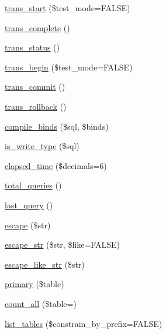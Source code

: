 \begin{DoxyCompactItemize}
\mbox{\hyperlink{class_c_i___d_b__driver_ab082d21c9a77398c6d6705d9e978fb20}{trans\+\_\+start}} (\$test\+\_\+mode=F\+A\+L\+SE)
\item 
\mbox{\hyperlink{class_c_i___d_b__driver_aa0edd209de428801ce5faa1fe740852e}{trans\+\_\+complete}} ()
\item 
\mbox{\hyperlink{class_c_i___d_b__driver_a7ce49452153f13afde8f9c5212028be6}{trans\+\_\+status}} ()
\item 
\mbox{\hyperlink{class_c_i___d_b__driver_a90e153cf190d273336d77cce930587e1}{trans\+\_\+begin}} (\$test\+\_\+mode=F\+A\+L\+SE)
\item 
\mbox{\hyperlink{class_c_i___d_b__driver_af4fbdcdace4aa94a139b64877601fe9b}{trans\+\_\+commit}} ()
\item 
\mbox{\hyperlink{class_c_i___d_b__driver_a53f76d4dfcd6ac04fb653982442aeef8}{trans\+\_\+rollback}} ()
\item 
\mbox{\hyperlink{class_c_i___d_b__driver_a0ba381d2e9078472bd0167e75cc8033c}{compile\+\_\+binds}} (\$sql, \$binds)
\item 
\mbox{\hyperlink{class_c_i___d_b__driver_af435df5703c238769d6d16fde6d51182}{is\+\_\+write\+\_\+type}} (\$sql)
\item 
\mbox{\hyperlink{class_c_i___d_b__driver_a7bcec8d3f7d72453deb78e296815711a}{elapsed\+\_\+time}} (\$decimals=6)
\item 
\mbox{\hyperlink{class_c_i___d_b__driver_a8fc0b6551e1ca0c68c6e3a66b27310fc}{total\+\_\+queries}} ()
\item 
\mbox{\hyperlink{class_c_i___d_b__driver_a8117354f1fa0b2873f0ad2792dc21389}{last\+\_\+query}} ()
\item 
\mbox{\hyperlink{class_c_i___d_b__driver_ac8f37ca5703d4558c732e692194f8cd6}{escape}} (\$str)
\item 
\mbox{\hyperlink{class_c_i___d_b__driver_aaba16891c8c93600a87075800cc5b72b}{escape\+\_\+str}} (\$str, \$like=F\+A\+L\+SE)
\item 
\mbox{\hyperlink{class_c_i___d_b__driver_a1a15f371afab8d5cfb35e38fc53c620f}{escape\+\_\+like\+\_\+str}} (\$str)
\item 
\mbox{\hyperlink{class_c_i___d_b__driver_a68e5f4a4a6fdb79a9a403b045c59b618}{primary}} (\$table)
\item 
\mbox{\hyperlink{class_c_i___d_b__driver_a7f59c2dc2e3226fe49f35f8c49e8fc94}{count\+\_\+all}} (\$table=\textquotesingle{}\textquotesingle{})
\item 
\mbox{\hyperlink{class_c_i___d_b__driver_accef90659bed312aba1c3df80620b402}{list\+\_\+tables}} (\$constrain\+\_\+by\+\_\+prefix=F\+A\+L\+SE)

\end{DoxyCompactItemize}
